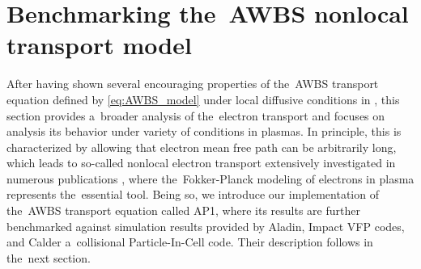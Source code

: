 
\section{Benchmarking the~AWBS nonlocal transport model}
\label{sec:BenchmarkingAWBS}
After having shown several encouraging properties of the~AWBS transport 
equation defined by \eqref{eq:AWBS_model} under local diffusive conditions
in , this section provides a~broader analysis
of the~electron transport and focuses on analysis its behavior under variety of
conditions in plasmas. In principle, this is characterized by allowing that
electron mean free path can be arbitrarily long, which leads to so-called 
nonlocal electron transport extensively investigated in numerous publications 
\cite{Malone_1975_15, Colombant_PoP2005, Bell_1981_83, LMV_1983_7, Brantov_Nonlocal_electron_transport_1998, schurtz2000, Sorbo_2015}, where the~Fokker-Planck
modeling of electrons in plasma represents the~essential tool. Being so, 
we introduce our implementation of the~AWBS transport equation called AP1,
where its results are further benchmarked against simulation results
provided by Aladin, Impact VFP codes, and Calder a~collisional Particle-In-Cell
code. Their description follows in the~next section.

